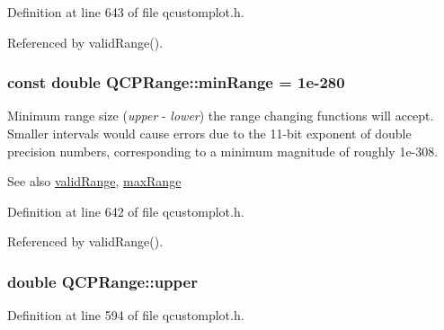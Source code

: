 Definition at line 643 of file qcustomplot.\+h.



Referenced by valid\+Range().

\hypertarget{class_q_c_p_range_ab46d3bc95030ee25efda41b89e2b616b}{}
\subsubsection[{min\+Range}]{\setlength{\rightskip}{0pt plus 5cm}const double Q\+C\+P\+Range\+::min\+Range = 1e-\/280\hspace{0.3cm}{\ttfamily [static]}}\label{class_q_c_p_range_ab46d3bc95030ee25efda41b89e2b616b}
Minimum range size ({\itshape upper} -\/ {\itshape lower}) the range changing functions will accept. Smaller intervals would cause errors due to the 11-\/bit exponent of double precision numbers, corresponding to a minimum magnitude of roughly 1e-\/308. \begin{DoxySeeAlso}{See also}
\hyperlink{class_q_c_p_range_ab38bd4841c77c7bb86c9eea0f142dcc0}{valid\+Range}, \hyperlink{class_q_c_p_range_a5ca51e7a2dc5dc0d49527ab171fe1f4f}{max\+Range} 
\end{DoxySeeAlso}


Definition at line 642 of file qcustomplot.\+h.



Referenced by valid\+Range().

\hypertarget{class_q_c_p_range_ae44eb3aafe1d0e2ed34b499b6d2e074f}{}
\subsubsection[{upper}]{\setlength{\rightskip}{0pt plus 5cm}double Q\+C\+P\+Range\+::upper}\label{class_q_c_p_range_ae44eb3aafe1d0e2ed34b499b6d2e074f}


Definition at line 594 of file qcustomplot.\+h.



